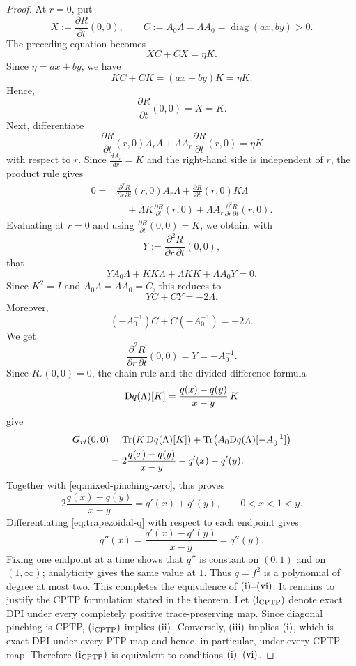 \documentclass[11pt]{amsart}
\theoremstyle{definition}
\theoremstyle{remark}
\newcommand{\Tr}{\operatorname{Tr}}
\begin{document}
\begin{proof}
At $r=0$, put
\[
X:=\frac{\partial R}{\partial t}(0,0),
\qquad
C:=A_0\Lambda=\Lambda A_0=\operatorname{diag}(ax,by)>0.
\]
The preceding equation becomes
\[
XC+CX=\eta K.
\]
Since $\eta=ax+by$, we have
\[
KC+CK=(ax+by)K=\eta K.
\]
Hence,
\[
\frac{\partial R}{\partial t}(0,0)=X=K.
\]
Next, differentiate
\[
\frac{\partial R}{\partial t}(r,0)A_r\Lambda
+\Lambda A_r\frac{\partial R}{\partial t}(r,0)=\eta K
\]
with respect to $r$.  Since
$\frac{dA_r}{dr}=K$
and the right-hand side is independent of $r$, the product rule gives
\[
\begin{aligned}
	0={}&
	\frac{\partial^2R}{\partial r\,\partial t}(r,0)A_r\Lambda
	+\frac{\partial R}{\partial t}(r,0)K\Lambda\\
	&\quad
	+\Lambda K\frac{\partial R}{\partial t}(r,0)
	+\Lambda A_r\frac{\partial^2R}{\partial r\,\partial t}(r,0).
\end{aligned}
\]
Evaluating at $r=0$ and using
$\frac{\partial R}{\partial t}(0,0)=K$, we obtain, with
\[
Y:=\frac{\partial^2R}{\partial r\,\partial t}(0,0),
\]
that
\[
YA_0\Lambda+KK\Lambda+\Lambda KK+\Lambda A_0Y=0.
\]
Since $K^2=I$ and $A_0\Lambda=\Lambda A_0=C$, this reduces to
\[
YC+CY=-2\Lambda.
\]
Moreover,
\[
(-A_0^{-1})C+C(-A_0^{-1})=-2\Lambda.
\]
We get
\[
\frac{\partial^2R}{\partial r\,\partial t}(0,0)
=Y=-A_0^{-1}.
\]
Since $R_r(0,0)=0$, the chain rule and the divided-difference formula
\cite[Chapter~3]{Higham2008}
\[
{\rm D}q(\Lambda)[K]
=\frac{q(x)-q(y)}{x-y}\,K
\]
give
\begin{align*}
	G_{rt}(0,0)
	&=\Tr\!\left(K\,{\rm D}q(\Lambda)[K]\right)
	+\Tr\!\left(A_0{\rm D}q(\Lambda)[-A_0^{-1}]\right)\\
	&=2\frac{q(x)-q(y)}{x-y}-q'(x)-q'(y).
\end{align*}
Together with \eqref{eq:mixed-pinching-zero}, this proves
\begin{equation}\label{eq:trapezoidal-q}
	2\frac{q(x)-q(y)}{x-y}=q'(x)+q'(y),
	\qquad 0<x<1<y.
\end{equation}
Differentiating \eqref{eq:trapezoidal-q} with respect to each endpoint
gives
\[
q''(x)=\frac{q'(x)-q'(y)}{x-y}=q''(y).
\]
Fixing one endpoint at a time shows that $q''$ is constant on
$(0,1)$ and on $(1,\infty)$; analyticity gives the same value at
$1$.  Thus $q=f^2$ is a polynomial of degree at most two.  This
completes the equivalence of ${\rm(i)}$--${\rm(vi)}$.  It remains to justify the CPTP formulation stated in the theorem. Let
$({\rm i}_{\rm CPTP})$ denote exact DPI under every completely positive
trace-preserving map. Since diagonal pinching is CPTP,
$({\rm i}_{\rm CPTP})$ implies ${\rm(ii)}$. Conversely,
${\rm(iii)}$ implies ${\rm(i)}$, which is exact DPI under every PTP
map and hence, in particular, under every CPTP map. Therefore
$({\rm i}_{\rm CPTP})$ is equivalent to conditions
${\rm(i)}$--${\rm(vi)}$.


\end{proof}
\end{document}

